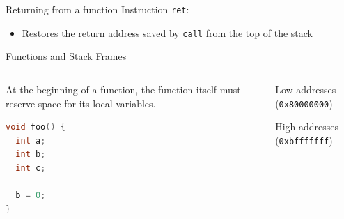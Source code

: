 \documentclass[]{beamer}
\begin{document}
\begin{frame}[fragile]{Returning from a function}
	Instruction {\tt ret}:
	\begin{itemize}
		\item Restores the return address saved by {\tt call} from the top of the stack
	\end{itemize}
\end{frame}

\renewcommand{\finishframe}[1]{
  \draw[snake=brace, line width=0.6pt, segment amplitude=7pt]
  (-2,\value{cellnb}-0.5) -- (-2,\value{startframe}-0.5);
  \draw (-3cm,\value{cellnb}*0.5+\value{startframe}*0.5-0.5) node {#1};
}

\begin{frame}[fragile]{Functions and Stack Frames}
  \begin{columns}
  \begin{column}{0.45\linewidth}
    At the beginning of a function, the function itself must reserve space for its local variables.
    \begin{lstlisting}[language={C}]
void foo() {
  int a;
  int b;
  int c;

  b = 0;
}
    \end{lstlisting}    
  \end{column}
  \begin{column}{0.4\linewidth}
    \par
    {\scriptsize Low addresses ({\tt 0x80000000})}\\[.5em]
    {\scriptsize High addresses ({\tt 0xbfffffff})}
  \end{column}
  \end{columns}
  \end{frame}
\end{document}
